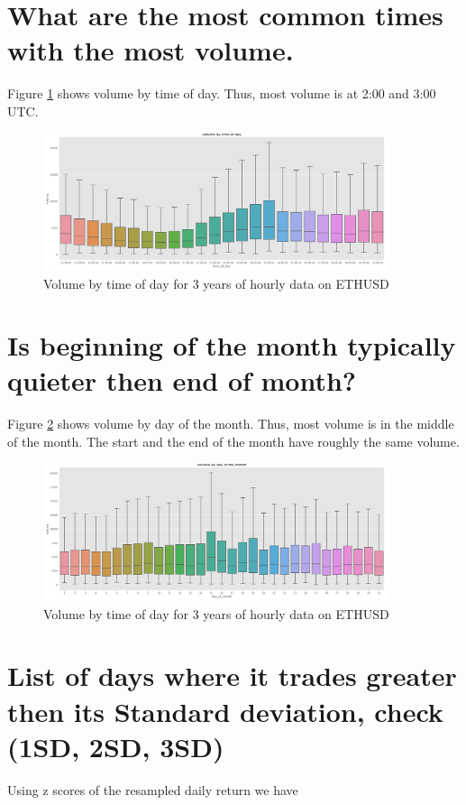 \section{ What are the most common times with the most volume.}
Figure \ref{fig:vol_times} shows volume by time of day. Thus, most volume is at 2:00 and 3:00 UTC.
\begin{figure}
\center
\includegraphics[width=0.9\textwidth]{fig/vol_times.png}
\caption{Volume by time of day for 3 years of hourly data on ETHUSD}
\label{fig:vol_times}
\end{figure}

\section{ Is beginning of the month typically quieter then end of month?}
Figure \ref{fig:qt} shows volume by day of the month. Thus, most volume is in the middle of the month. The start and the end of the month have roughly the same volume.
\begin{figure}
\center
\includegraphics[width=0.9\textwidth]{fig/qt.png}
\caption{Volume by time of day for 3 years of hourly data on ETHUSD}
\label{fig:qt}
\end{figure}

\section{ List of days where it trades greater then its Standard deviation, check (1SD, 2SD, 3SD)}
Using z scores of the resampled daily return we have

